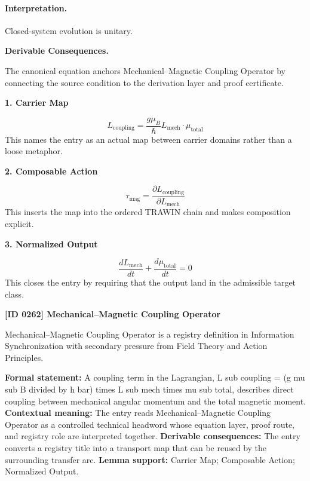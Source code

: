 \paragraph{Interpretation.}
Closed-system evolution is unitary.

\par\vspace{0.35em}
\noindent\textbf{Derivable Consequences.}\quad
\begingroup
\footnotesize
\raggedright
The canonical equation anchors Mechanical--Magnetic Coupling Operator by connecting the source condition to the derivation layer and proof certificate.
\par\endgroup

\noindent\textbf{1. Carrier Map}\par
\[
L_{\mathrm{coupling}}=\frac{g\mu_B}{\hbar}L_{\mathrm{mech}}\cdot\mu_{\mathrm{total}}
\]
\noindent This names the entry as an actual map between carrier domains rather than a loose metaphor.\par
\noindent\textbf{2. Composable Action}\par
\[
\tau_{\mathrm{mag}}=\frac{\partial L_{\mathrm{coupling}}}{\partial L_{\mathrm{mech}}}
\]
\noindent This inserts the map into the ordered TRAWIN chain and makes composition explicit.\par
\noindent\textbf{3. Normalized Output}\par
\[
\frac{dL_{\mathrm{mech}}}{dt}+\frac{d\mu_{\mathrm{total}}}{dt}=0
\]
\noindent This closes the entry by requiring that the output land in the admissible target class.\par

\clearpage
\noindent\textbf{[ID 0262] Mechanical--Magnetic Coupling Operator}\par
\vspace{0.35em}
\begingroup\small
{}
Mechanical--Magnetic Coupling Operator is a registry definition in Information Synchronization with secondary pressure from Field Theory and Action Principles.

\begingroup\footnotesize\setlength{\emergencystretch}{3em}\sloppy
\textbf{Formal statement:} A coupling term in the Lagrangian, L sub coupling = (g mu sub B divided by h bar) times L sub mech times mu sub total, describes direct coupling between mechanical angular momentum and the total magnetic moment. \textbf{Contextual meaning:} The entry reads Mechanical--Magnetic Coupling Operator as a controlled technical headword whose equation layer, proof route, and registry role are interpreted together. \textbf{Derivable consequences:} The entry converts a registry title into a transport map that can be reused by the surrounding transfer arc. \textbf{Lemma support:} Carrier Map; Composable Action; Normalized Output.\par
\endgroup

